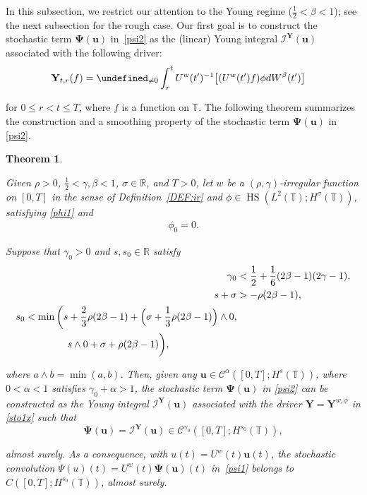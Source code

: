 \documentclass[letterpaper, 11pt,  reqno]{amsart}
\newtheorem{theorem}{Theorem} [section]
\DeclareMathOperator{\HS}{HS}
\newcommand{\1}{\hspace{0.5mm}\textup{I}\hspace{0.5mm}}
\newcommand{\I}{\mathcal{I}}
\newcommand{\noi}{\noindent}
\newcommand{\R}{\mathbb{R}}
\newcommand{\T}{\mathbb{T}}
\let\P= \undefined
\newcommand{\P}{\mathbf{P}}
\newcommand{\CC}{\mathcal{C}}
\newcommand{\al}{\alpha}
\newcommand{\be}{\beta}
\newcommand{\g}{\gamma}
\newcommand{\s}{\sigma}
\newcommand{\uw}{U^w}
\newcommand{\uu}{\mathbf{u}}
\newcommand{\PPsi}{\pmb{\Psi}}
\newcommand{\YY}{\mathbf{Y}}
\numberwithin{equation}{section}
\numberwithin{theorem}{section}
\begin{document}
\medskip






In this subsection, we restrict our attention
to the Young regime 
($\frac 12 < \be < 1$);
see the next subsection for the rough case.
Our first goal is to construct the stochastic term $\PPsi(\uu)$ in~\eqref{psi2}
as the (linear) Young integral $\I^{\YY}(\uu)$ associated 
with the following driver:
\begin{align}
\begin{split}
\YY_{t, r}(f)
&  = \P_{\ne 0} \int_r^t
\uw(t')^{-1} \big[ (\uw(t') f)
\phi dW^\be(t') \big]
\end{split}
\label{sto1x}
\end{align}

\noi
for $0 \le r < t \le T$, 
 where  $f$ is a function on $\T$.
The following theorem summarizes
the construction and 
a smoothing property of the stochastic term $\PPsi(\uu)$ in \eqref{psi2}.



\begin{theorem}\label{THM:1}


Given 
$\rho > 0$, 
$\frac 12 < \g, \be < 1$, $ \s \in \R$, and $T > 0$, 
let 
$w$ be 
 a $(\rho,\g)$-irregular function on $[0, T]$ in the sense of Definition~\ref{DEF:ir}
 and 
$\phi \in \HS(L^2(\T); H^\s(\T))$, satisfying
\eqref{phi1} and 
\begin{align}
\phi_0 = 0.
\label{phi2}
\end{align}


\noi
Suppose that 
$ \g_0 > 0 $ and $s, s_0 \in \R$ satisfy 
\begin{align}
\g_0 & <  \frac 12 + \frac 16 (2\be - 1)(2\g-1), 
\label{YT1}\\
s + \s & > -   \rho (2\be -1 ), 
\label{YT2}\\
\begin{split}
s_0 & < \min \bigg(s + \frac 23 \rho(2\be -1) + \Big(\s + \frac 13 \rho(2\be -1)\Big) \wedge 0, \\ 
& \hphantom{iiXXXX}s\wedge0 + \s +  \rho (2\be -1 )\bigg), 
\end{split}
\label{YT3}
\end{align}


\noi
where $a\wedge b = \min(a, b)$.
Then, given any $\uu \in \CC^\al([0, T]; H^s(\T))$, 
where
 $0 < \al < 1$ satisfies
$\g_0 + \al > 1$, 
the stochastic term $\PPsi (\uu)$ in \eqref{psi2} can be constructed as 
the Young integral
$\I^\YY(\uu)$ 
associated with the driver $\YY = \YY^{w, \phi}$ in \eqref{sto1x}
such that 
\[\PPsi(\uu) = \I^\YY(\uu)
 \in \CC^{\g_0}([0, T]; H^{s_0}(\T)),\] 

\noi
almost surely.
 As a  consequence, with $u(t) = \uw(t)\uu(t)$, 
 the stochastic convolution $\Psi(u)(t) = \uw(t)\PPsi(\uu)(t)$
 in~\eqref{psi1}
belongs to 
$C([0, T]; H^{s_0}(\T))$, almost surely.





\end{theorem}
\end{document}
